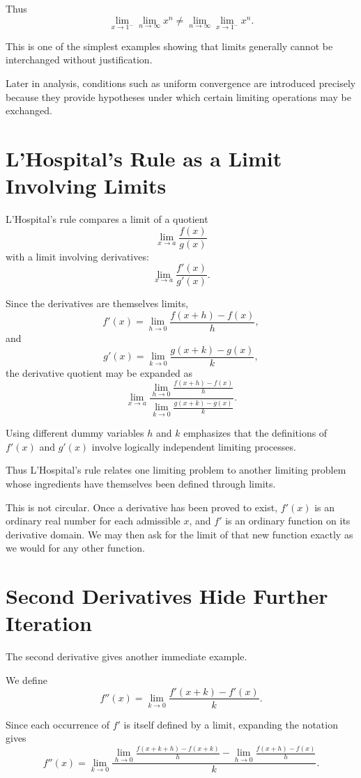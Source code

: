 \documentclass{essay}
\begin{document}
Thus
\[
\boxed{
\lim_{x\to1^-}\lim_{n\to\infty}x^n
\neq
\lim_{n\to\infty}\lim_{x\to1^-}x^n.
}
\]

This is one of the simplest examples showing that limits generally cannot be interchanged without justification.

Later in analysis, conditions such as uniform convergence are introduced precisely because they provide hypotheses under which certain limiting operations may be exchanged.

\section{L'Hospital's Rule as a Limit Involving Limits}

L'Hospital's rule compares a limit of a quotient
\[
\lim_{x\to a}\frac{f(x)}{g(x)}
\]
with a limit involving derivatives:
\[
\lim_{x\to a}\frac{f'(x)}{g'(x)}.
\]

Since the derivatives are themselves limits,
\[
f'(x)
=
\lim_{h\to0}
\frac{f(x+h)-f(x)}{h},
\]
and
\[
g'(x)
=
\lim_{k\to0}
\frac{g(x+k)-g(x)}{k},
\]
the derivative quotient may be expanded as
\[
\lim_{x\to a}
\frac{
\displaystyle
\lim_{h\to0}
\frac{f(x+h)-f(x)}{h}
}{
\displaystyle
\lim_{k\to0}
\frac{g(x+k)-g(x)}{k}
}.
\]

Using different dummy variables \(h\) and \(k\) emphasizes that the definitions of \(f'(x)\) and \(g'(x)\) involve logically independent limiting processes.

Thus L'Hospital's rule relates one limiting problem to another limiting problem whose ingredients have themselves been defined through limits.

This is not circular. Once a derivative has been proved to exist, \(f'(x)\) is an ordinary real number for each admissible \(x\), and \(f'\) is an ordinary function on its derivative domain. We may then ask for the limit of that new function exactly as we would for any other function.

\section{Second Derivatives Hide Further Iteration}

The second derivative gives another immediate example.

We define
\[
f''(x)
=
\lim_{k\to0}
\frac{f'(x+k)-f'(x)}{k}.
\]

Since each occurrence of \(f'\) is itself defined by a limit, expanding the notation gives
\[
f''(x)
=
\lim_{k\to0}
\frac{
\displaystyle
\lim_{h\to0}
\frac{f(x+k+h)-f(x+k)}{h}
-
\displaystyle
\lim_{h\to0}
\frac{f(x+h)-f(x)}{h}
}{k}.
\]
\end{document}

